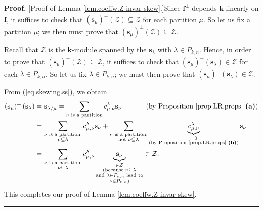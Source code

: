 \documentclass[numbers=enddot,12pt,final,onecolumn,notitlepage]{scrartcl}%
\theoremstyle{definition}
\newenvironment{proof}[1][Proof]{\noindent\textbf{#1.} }{\ \rule{0.5em}{0.5em}}
\let\sumnonlimits\sum
\renewcommand{\sum}{\sumnonlimits\limits}
\begin{document}
\begin{proof}
[Proof of Lemma \ref{lem.coeffw.Z-invar-skew}.]Since $\mathbf{f}^{\perp}$
depends $\mathbf{k}$-linearly on $\mathbf{f}$, it suffices to check that
$\left(  \mathbf{s}_{\mu}\right)  ^{\perp}\left(  \mathcal{Z}\right)
\subseteq\mathcal{Z}$ for each partition $\mu$. So let us fix a partition
$\mu$; we then must prove that $\left(  \mathbf{s}_{\mu}\right)  ^{\perp
}\left(  \mathcal{Z}\right)  \subseteq\mathcal{Z}$.

Recall that $\mathcal{Z}$ is the $\mathbf{k}$-module spanned by the
$\mathbf{s}_{\lambda}$ with $\lambda\in P_{k,n}$. Hence, in order to prove
that $\left(  \mathbf{s}_{\mu}\right)  ^{\perp}\left(  \mathcal{Z}\right)
\subseteq\mathcal{Z}$, it suffices to check that $\left(  \mathbf{s}_{\mu
}\right)  ^{\perp}\left(  \mathbf{s}_{\lambda}\right)  \in\mathcal{Z}$ for
each $\lambda\in P_{k,n}$. So let us fix $\lambda\in P_{k,n}$; we must then
prove that $\left(  \mathbf{s}_{\mu}\right)  ^{\perp}\left(  \mathbf{s}%
_{\lambda}\right)  \in\mathcal{Z}$.

From (\ref{eq.skewing.ss}), we obtain%
\begin{align*}
\left(  \mathbf{s}_{\mu}\right)  ^{\perp}\left(  \mathbf{s}_{\lambda}\right)
&  =\mathbf{s}_{\lambda/\mu}=\sum_{\nu\text{ is a partition}}c_{\mu,\nu
}^{\lambda}\mathbf{s}_{\nu}\ \ \ \ \ \ \ \ \ \ \left(  \text{by Proposition
\ref{prop.LR.props} \textbf{(a)}}\right) \\
&  =\sum_{\substack{\nu\text{ is a partition;}\\\nu\subseteq\lambda}%
}c_{\mu,\nu}^{\lambda}\mathbf{s}_{\nu}+\sum_{\substack{\nu\text{ is a
partition;}\\\text{not }\nu\subseteq\lambda}}\underbrace{c_{\mu,\nu}^{\lambda
}}_{\substack{=0\\\text{(by Proposition \ref{prop.LR.props} \textbf{(b)})}%
}}\mathbf{s}_{\nu}\\
&  =\sum_{\substack{\nu\text{ is a partition;}\\\nu\subseteq\lambda}%
}c_{\mu,\nu}^{\lambda}\underbrace{\mathbf{s}_{\nu}}_{\substack{\in
\mathcal{Z}\\\text{(because }\nu\subseteq\lambda\\\text{and }\lambda\in
P_{k,n}\text{ lead to}\\\nu\in P_{k,n}\text{)}}}\in\mathcal{Z}.
\end{align*}
This completes our proof of Lemma \ref{lem.coeffw.Z-invar-skew}.
\end{proof}
\end{document}
